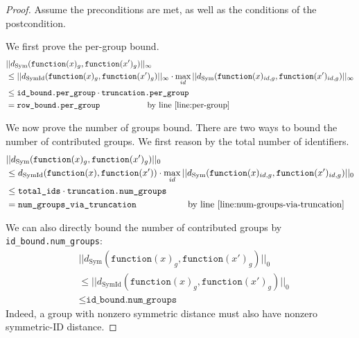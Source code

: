 \documentclass{article}
\begin{document}
\begin{proof}
    Assume the preconditions are met, as well as the conditions of the postcondition.

    We first prove the per-group bound.
    \begin{align*}
        &||d_{\mathrm{Sym}}(\texttt{function}(x)_{g}, \texttt{function}(x')_{g})||_\infty \\
        &\le ||d_{\mathrm{SymId}}(\texttt{function}(x)_{g}, \texttt{function}(x')_{g})||_\infty \cdot \max_{id} ||d_{\mathrm{Sym}}(\texttt{function}(x)_{id,g}, \texttt{function}(x')_{id,g})||_\infty \\
        &\le \texttt{id\_bound.per\_group} \cdot \texttt{truncation.per\_group}\\
        &= \texttt{row\_bound.per\_group} \hspace{2cm} \text{by line } \ref{line:per-group}
    \end{align*}

    We now prove the number of groups bound.
    There are two ways to bound the number of contributed groups.
    We first reason by the total number of identifiers.
    \begin{align*}
        &||d_{\mathrm{Sym}}(\texttt{function}(x)_{g}, \texttt{function}(x')_{g})||_0 \\
        &\le d_{\mathrm{SymId}}(\texttt{function}(x), \texttt{function}(x')) \cdot \max_{id} ||d_{\mathrm{Sym}}(\texttt{function}(x)_{id,g}, \texttt{function}(x')_{id,g})||_0 \\
        &\le \texttt{total\_ids} \cdot \texttt{truncation.num\_groups} \\
        &= \texttt{num\_groups\_via\_truncation} \hspace{2cm} \text{by line } \ref{line:num-groups-via-truncation}
    \end{align*}

    We can also directly bound the number of contributed groups by \texttt{id\_bound.num\_groups}:
    \begin{align*}
        &||d_{\mathrm{Sym}}(\texttt{function}(x)_{g}, \texttt{function}(x')_{g})||_0 \\
        &\le ||d_{\mathrm{SymId}}(\texttt{function}(x)_{g}, \texttt{function}(x')_{g})||_0 \\
        &\le \texttt{id\_bound.num\_groups}
    \end{align*}
    Indeed, a group with nonzero symmetric distance must also have nonzero symmetric-ID distance.


\end{proof}
\end{document}
